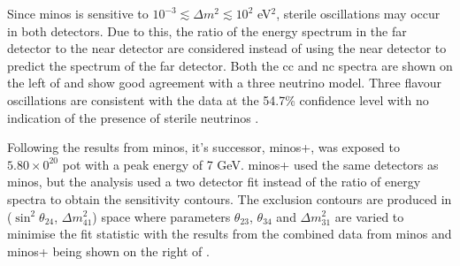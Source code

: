 Since \gls{minos} is sensitive to $10^{-3} \lesssim \Delta m^2 \lesssim 10^2$ eV$^2$, sterile oscillations may occur in both detectors. Due to this, the ratio of the energy spectrum in the far detector to the near detector are considered instead of using the near detector to predict the spectrum of the far detector. Both the \gls{cc} and \gls{nc} spectra are shown on the left of  and show good agreement with a three neutrino model. Three flavour oscillations are consistent with the data at the 54.7\% confidence level with no indication of the presence of sterile neutrinos \cite{MINOS}. 

Following the results from \gls{minos}, it's successor, \gls{minos}+, was exposed to $5.80 \times 0^{20}$ \gls{pot} with a peak \numu energy of 7 GeV. \gls{minos}+ used the same detectors as \gls{minos}, but the analysis used a two detector fit instead of the ratio of energy spectra to obtain the sensitivity contours. The exclusion contours are produced in ($\sin^2{\theta_{24}}$, $\Delta m^2_{41}$) space where parameters $\theta_{23}$, $\theta_{34}$ and $\Delta m^2_{31}$ are varied to minimise the fit statistic with the results from the combined data from \gls{minos} and \gls{minos}+ being shown on the right of  \cite{MINOS_numu_disapp_contour}.

